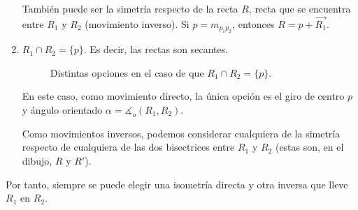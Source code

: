 \begin{ejercicio}
\begin{enumerate}
        También puede ser la simetría respecto de la recta $R$, recta que se encuentra entre $R_1$ y $R_2$ (movimiento inverso). Si $p=m_{p_1p_2}$, entonces $R=p+\vec{R_1}$.


        \item $R_1\cap R_2 = \{p\}$. Es decir, las rectas son secantes.
        \begin{figure}[H]
            \centering
            \caption{Distintas opciones en el caso de que $R_1\cap R_2=\{p\}$.}
        \end{figure}

        En este caso, como movimiento directo, la única opción es el giro de centro $p$ y ángulo orientado $\alpha=\measuredangle_o (R_1,R_2)$.

        Como movimientos inversos, podemos considerar cualquiera de la simetría respecto de cualquiera de las dos bisectrices entre $R_1$ y $R_2$ (estas son, en el dibujo, $R$ y $R'$).
    \end{enumerate}
    Por tanto, siempre se puede elegir una isometría directa y otra inversa que lleve $R_1$ en $R_2$.
\end{ejercicio}

